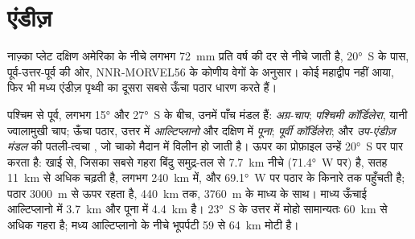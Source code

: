 \section{एंडीज़}\label{sec:b2:himalaya-andes:andes}

नाज़्का प्लेट दक्षिण अमेरिका के नीचे लगभग \qty{72}{mm} प्रति वर्ष की दर से नीचे जाती है,
\ang{20}~S के पास, पूर्व-उत्तर-पूर्व की ओर, NNR-MORVEL56 के कोणीय वेगों के अनुसार। कोई महाद्वीप
नहीं आया, फिर भी मध्य एंडीज़ पृथ्वी का दूसरा सबसे ऊँचा पठार धारण करते हैं।

पश्चिम से पूर्व, लगभग \ang{15} और \ang{27}~S के बीच, उनमें पाँच मंडल हैं:
\emph{अग्र-चाप}; \emph{पश्चिमी कॉर्डिलेरा}, यानी ज्वालामुखी चाप; ऊँचा पठार, उत्तर में
\emph{आल्टिप्लानो} और दक्षिण में \emph{पूना}; \emph{पूर्वी
कॉर्डिलेरा}; और \emph{उप-एंडीज़ मंडल} की पतली-त्वचा , जो
चाको मैदान में विलीन हो जाती है। ऊपर का प्रोफ़ाइल उन्हें \ang{20}~S पर पार करता है: खाई से,
जिसका सबसे गहरा बिंदु समुद्र-तल से \qty{7.7}{km} नीचे (\ang{71.4}~W पर) है, सतह
\qty{11}{km} से अधिक चढ़ती है, लगभग \qty{240}{km} में, और \ang{69.1}~W पर पठार के किनारे तक पहुँचती है;
पठार \qty{3000}{m} से ऊपर रहता है, \qty{440}{km} तक,
\qty{3760}{m} के माध्य के साथ। माध्य ऊँचाई आल्टिप्लानो में \qty{3.7}{km} और पूना में \qty{4.4}{km}
है। \ang{23}~S के उत्तर में मोहो सामान्यतः \qty{60}{km} से अधिक गहरा है;
मध्य आल्टिप्लानो के नीचे भूपर्पटी 59 से \qty{64}{km} मोटी है।

